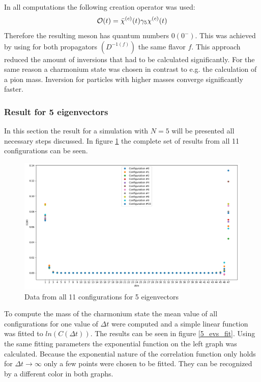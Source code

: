     In all computations the following creation operator was used:
    \begin{equation}
        \mathcal{O}(t) = \bar{\chi}^{(c)}(t)\gamma_5\chi^{(c)}(t)
    \end{equation}
    Therefore the resulting meson has quantum numbers $0(0^-)$. This was achieved by using for both propagators $(D^{-1(f)})$ the same flavor $f$. This approach reduced the amount of inversions that had to be calculated significantly. For the same reason a charmonium state was chosen in contrast to e.g. the calculation of a pion mass. Inversion for particles with higher masses converge significantly faster.
    
    \subsubsection{Result for 5 eigenvectors}
    In this section the result for a simulation with $N = 5$ will be presented all necessary steps discussed. In figure \ref{5_evs_full} the complete set of results from all 11 configurations can be seen.

    \begin{figure}[H]
        \centering
        \includegraphics[width=1\textwidth]{images/5ev_all_configs.png} %
        \caption{Data from all 11 configurations for 5 eigenvectors}
        \label{5_evs_full}
    \end{figure}
    
    To compute the mass of the charmonium state the mean value of all configurations for one value of $\Delta t$ were computed and a simple linear function was fitted to $ln(C(\Delta t))$. The results can be seen in figure \ref{5_evs_fit}. Using the same fitting parameters the exponential function on the left graph was calculated. Because the exponential nature of the correlation function only holds for $\Delta t \rightarrow \infty$ only a few points were chosen to be fitted. They can be recognized by a different color in both graphs.
    
